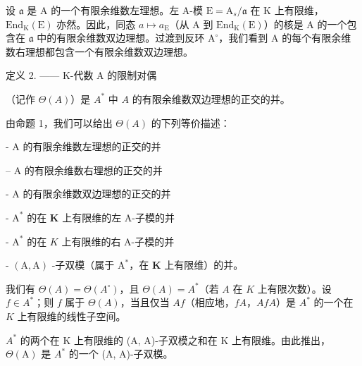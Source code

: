 设 \(\mathfrak{a}\) 是 A 的一个有限余维数左理想。左 A-模 \(\mathrm{E} = \mathrm{A}_s / \mathfrak{a}\) 在 K 上有限维，\(\mathrm{End}_{\mathrm{K}}(\mathrm{E})\) 亦然。因此，同态 \(a \mapsto a_{\mathrm{E}}\)（从 A 到 \(\mathrm{End}_{\mathrm{K}}(\mathrm{E})\)）的核是 A 的一个包含在 \(\mathfrak{a}\) 中的有限余维数双边理想。过渡到反环 \(\mathrm{A}^{\circ}\)，我们看到 A 的每个有限余维数右理想都包含一个有限余维数双边理想。

定义 2. —— K-代数 A 的限制对偶

（记作 \(\Theta(A)\)）是 \(A^{*}\) 中 \(A\) 的有限余维数双边理想的正交的并。

由命题 1，我们可以给出 \(\Theta(A)\) 的下列等价描述：

- A 的有限余维数左理想的正交的并

-- A 的有限余维数右理想的正交的并

- \(\mathrm{A}\) 的有限余维数双边理想的正交的并

- \(\mathrm{A}^*\) 的在 \(\mathbf{K}\) 上有限维的左 A-子模的并

- \(\mathrm{A}^*\) 的在 \(K\) 上有限维的右 A-子模的并

- \((\mathrm{A},\mathrm{A})\) -子双模（属于 \(\mathrm{A}^*\)，在 \(\mathbf{K}\) 上有限维）的并。

我们有 \(\Theta(A) = \Theta(A^{\circ})\)，且 \(\Theta(A) = A^{*}\)（若 \(A\) 在 \(K\) 上有限次数）。设 \(f \in A^{*}\)；则 \(f\) 属于 \(\Theta(A)\)，当且仅当 \(Af\)（相应地，\(fA\)，\(AfA\)）是 \(A^{*}\) 的一个在 \(K\) 上有限维的线性子空间。

\(A^{*}\) 的两个在 K 上有限维的 (A, A)-子双模之和在 K 上有限维。由此推出，\(\Theta(\mathrm{A})\) 是 \(A^{*}\) 的一个 (A, A)-子双模。

